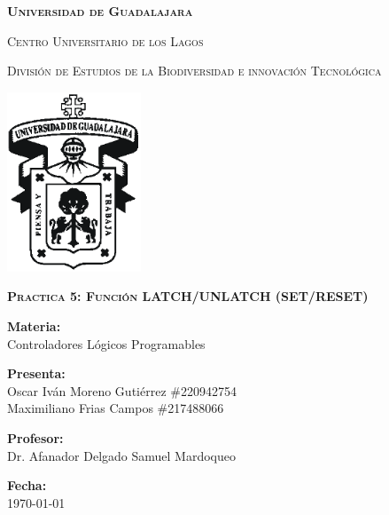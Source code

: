 \documentclass[12pt]{report}
\begin{document}
\setlength{\hoffset}{27 pt} %
\begin{titlepage}
{\centering
{\scshape\bfseries\fontsize{29.16}{34.992}\selectfont Universidad de Guadalajara \par}
\vspace{0.5cm}
{\scshape\Large Centro Universitario de los Lagos \par}
\vspace{1cm}
{\scshape\Large División de Estudios de la Biodiversidad e innovación Tecnológica \par}
\vspace{1cm}
{\graphicspath{{imagenes/Portada}} %
\includegraphics[width=0.3\textwidth]{image.png}\par}
\vspace{1cm}
{\scshape\large\bfseries Practica 5: Función LATCH/UNLATCH (SET/RESET) \par}
\vspace{0.5cm}
{\large \textbf{Materia:} \\Controladores Lógicos Programables\par}
\vfill
{\large \textbf{Presenta:} \\Oscar Iván Moreno Gutiérrez \#220942754
\\Maximiliano Frias Campos \#217488066
\par}
\vfill
{\large \textbf{Profesor:} \\Dr. Afanador Delgado Samuel Mardoqueo \par}
\vfill
\vfill
\begin{flushright}
  {\normalsize \textbf {Fecha:} \\ \today}
\end{flushright}
\vfill}
{\large  \par}
\end{titlepage}
\end{document}
